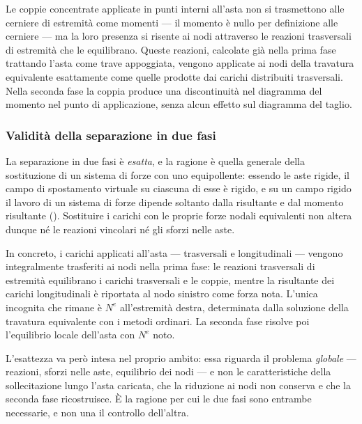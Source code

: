 \begin{oss}
	Le coppie concentrate applicate in punti interni
	all'asta non si trasmettono alle cerniere di
	estremità come momenti --- il momento è nullo
	per definizione alle cerniere --- ma la loro
	presenza si risente ai nodi attraverso le
	reazioni trasversali di estremità che le
	equilibrano. Queste reazioni, calcolate già
	nella prima fase trattando l'asta come trave
	appoggiata, vengono applicate ai nodi della
	travatura equivalente esattamente come quelle
	prodotte dai carichi distribuiti trasversali.
	Nella seconda fase la coppia produce una
	discontinuità nel diagramma del momento nel
	punto di applicazione, senza alcun effetto
	sul diagramma del taglio.
\end{oss}

\subsubsection{Validità della separazione in due fasi}
\label{subsec:validita_due_fasi}

La separazione in due fasi è \emph{esatta}, e la ragione
è quella generale della sostituzione di un sistema di
forze con uno equipollente: essendo le aste rigide, il
campo di spostamento virtuale su ciascuna di esse è
rigido, e su un campo rigido il lavoro di un sistema di
forze dipende soltanto dalla risultante e dal momento
risultante ().
Sostituire i carichi con le proprie forze nodali
equivalenti non altera dunque né le reazioni vincolari né
gli sforzi nelle aste.

In concreto, i carichi applicati all'asta --- trasversali
e longitudinali --- vengono integralmente trasferiti ai
nodi nella prima fase: le reazioni trasversali di
estremità equilibrano i carichi trasversali e le coppie,
mentre la risultante dei carichi longitudinali è riportata
al nodo sinistro come forza nota. L'unica incognita che
rimane è $N^e$ all'estremità destra, determinata dalla
soluzione della travatura equivalente con i metodi
ordinari. La seconda fase risolve poi l'equilibrio locale
dell'asta con $N^e$ noto.

L'esattezza va però intesa nel proprio ambito: essa
riguarda il problema \emph{globale} --- reazioni, sforzi
nelle aste, equilibrio dei nodi --- e non le
caratteristiche della sollecitazione lungo l'asta
caricata, che la riduzione ai nodi non conserva e che la
seconda fase ricostruisce. È la ragione per cui le due
fasi sono entrambe necessarie, e non una il controllo
dell'altra.



